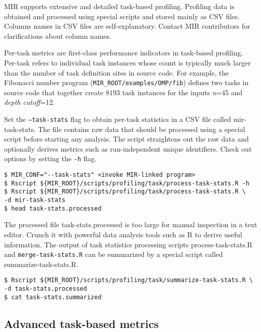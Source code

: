 \documentclass[11pt,a4paper]{article}
\begin{document}
MIR supports extensive and detailed task-based profiling. Profiling data is obtained and processed using special scripts and stored mainly as CSV files. Columns names in CSV files are self-explanatory. Contact MIR contributors for clarifications about column names.

Per-task metrics are first-class performance indicators in task-based profiling.
Per-task refers to individual task instances whose count is typically much larger than the number of task definition sites in source code. For example, the Fibonacci number program (\texttt{MIR\_ROOT/examples/OMP/fib}) defines two tasks in source code that together create 8193 task instances for the inputs \textit{n}=45 and \textit{depth cutoff}=12.

Set the \texttt{--task-stats} flag to obtain per-task statistics in a CSV file called \textsf{mir-task-stats}. The file contains raw data that should be processed using a special script before starting any analysis. The script straightens out the raw data and optionally derives metrics such as run-independent unique identifiers. Check out options by setting the \texttt{-h} flag.

\begin{lstlisting}[style=MyInputStyle]
$ MIR_CONF="--task-stats" <invoke MIR-linked program>
$ Rscript ${MIR_ROOT}/scripts/profiling/task/process-task-stats.R -h
$ Rscript ${MIR_ROOT}/scripts/profiling/task/process-task-stats.R \
-d mir-task-stats
$ head task-stats.processed
\end{lstlisting}

The processed file \textsf{task-stats.processed} is too large for manual inspection in a text editor. Crunch it with powerful data analysis tools such as R to derive useful information. The output of task statistics processing scripts \textsf{process-task-stats.R} and \texttt{merge-task-stats.R} can be summarized by a special script called \textsf{summarize-task-stats.R}.

\begin{lstlisting}[style=MyInputStyle]
$ Rscript ${MIR_ROOT}/scripts/profiling/task/summarize-task-stats.R \
-d task-stats.processed
$ cat task-stats.summarized
\end{lstlisting}

\subsection{Advanced task-based metrics}
\label{sub:advanced_task_based_metrics}
\end{document}
